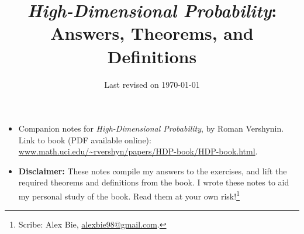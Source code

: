 \documentclass[10pt, oneside]{article}
\begin{document}
\title{\textit{High-Dimensional Probability}: Answers, Theorems, and Definitions}
\author{}
\date{\vspace{-3ex}Last revised on \today}

\maketitle
\vspace{-10pt}

\begin{itemize}
\item Companion notes for \textit{High-Dimensional Probability}, by Roman Vershynin. Link to book (PDF available online): \url{www.math.uci.edu/~rvershyn/papers/HDP-book/HDP-book.html}.
\item \textbf{Disclaimer:} These notes compile my answers to the exercises, and lift the required theorems and definitions from the book. I wrote these notes to aid my personal study of the book. 
Read them at your own risk!\footnote{Scribe: Alex Bie, \url{alexbie98@gmail.com}.}
\end{itemize}

\setcounter{section}{-1}
\tableofcontents

\newpage




\end{document}
